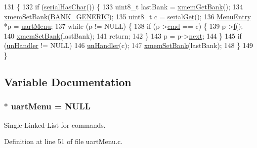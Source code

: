 \begin{DoxyCode}
131                         \{
132     \textcolor{keywordflow}{if} (\hyperlink{group__uart_ga27cc67be388d64af00ef64e22f75686d}{serialHasChar}()) \{
133         uint8\_t lastBank = \hyperlink{group__xmem_ga575f63170f6fc636556f8d955cbd42cd}{xmemGetBank}();
134         \hyperlink{group__xmem_ga619fa66b9f38be684f4331951fc91730}{xmemSetBank}(\hyperlink{group__xmem_ga6b1167d0078b33af8ec17ededaebe0cb}{BANK\_GENERIC});
135         uint8\_t c = \hyperlink{group__uart_ga3a3f6acfefa86dc78ec2d2455fc71709}{serialGet}();
136         \hyperlink{struct_menu_entry}{MenuEntry} *p = \hyperlink{group__uartmenu_gaedd623ea603861db72748b5b03859ba9}{uartMenu};
137         \textcolor{keywordflow}{while} (p != NULL) \{
138             \textcolor{keywordflow}{if} (p->\hyperlink{struct_menu_entry_a4d43e8212bdc9dbee866506f04effcea}{cmd} == c) \{
139                 p->\hyperlink{struct_menu_entry_afe96196d3564b9577477236d13329241}{f}();
140                 \hyperlink{group__xmem_ga619fa66b9f38be684f4331951fc91730}{xmemSetBank}(lastBank);
141                 \textcolor{keywordflow}{return};
142             \}
143             p = p->\hyperlink{struct_menu_entry_af79f4060fda1c0b572c15c3dd99b09a5}{next};
144         \}
145         \textcolor{keywordflow}{if} (\hyperlink{group__uartmenu_ga59944eadba9321ee37f247a13bc8ec1a}{unHandler} != NULL)
146             \hyperlink{group__uartmenu_ga59944eadba9321ee37f247a13bc8ec1a}{unHandler}(c);
147         \hyperlink{group__xmem_ga619fa66b9f38be684f4331951fc91730}{xmemSetBank}(lastBank);
148     \}
149 \}
\end{DoxyCode}


\subsection{Variable Documentation}
\hypertarget{group__uartmenu_gaedd623ea603861db72748b5b03859ba9}{
\subsubsection[{uart\-Menu}]{$\ast$ uart\-Menu = N\-U\-L\-L}}\label{group__uartmenu_gaedd623ea603861db72748b5b03859ba9}


Single-\/\-Linked-\/\-List for commands. 



Definition at line 51 of file uart\-Menu.\-c.



